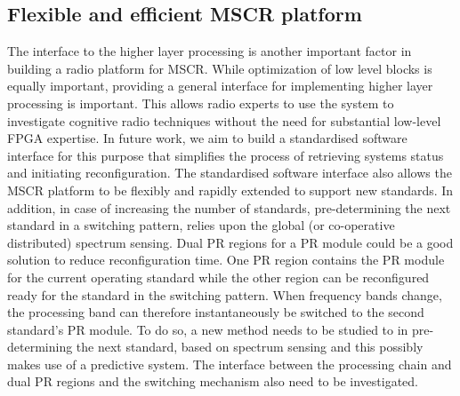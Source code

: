 \subsection{Flexible and efficient MSCR platform}
The interface to the higher layer processing is another important factor in building a radio platform for MSCR.
While optimization of low level blocks is equally important, providing a general interface for implementing higher layer processing is important. 
This allows radio experts to use the system to investigate cognitive radio techniques without the need for substantial low-level FPGA expertise.
In future work, we aim to build a standardised software interface for this purpose that simplifies the process of retrieving systems status and initiating reconfiguration.
The standardised software interface also allows the MSCR platform to be flexibly and rapidly extended to support new standards.
In addition, in case of increasing the number of standards, pre-determining the next standard in a switching pattern, relies upon the global (or co-operative distributed) spectrum sensing.
Dual PR regions for a PR module could be a good solution to reduce reconfiguration time. 
One PR region contains the PR module for the current operating standard while the other region can be reconfigured ready for the standard in the switching pattern. 
When frequency bands change, the processing band can therefore instantaneously be switched to the second standard's PR module.
To do so, a new method needs to be studied to in pre-determining the next standard, based on spectrum sensing and this possibly makes use of a predictive system.
The interface between the processing chain and dual PR regions and the switching mechanism also need to be investigated.




